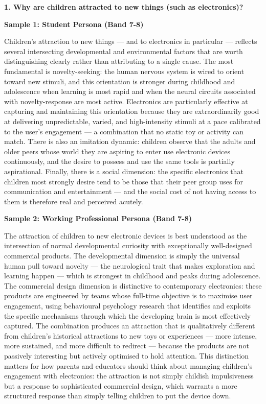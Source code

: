 \partthreeheader

\begin{ieltsquestion}
\textbf{1. Why are children attracted to new things (such as electronics)?}
\end{ieltsquestion}
\textbf{Sample 1: Student Persona (Band 7-8)}

Children's attraction to new things — and to electronics in particular — reflects several intersecting developmental and environmental factors that are worth distinguishing clearly rather than attributing to a single cause. The most fundamental is novelty-seeking: the human nervous system is wired to orient toward new stimuli, and this orientation is stronger during childhood and adolescence when learning is most rapid and when the neural circuits associated with novelty-response are most active. Electronics are particularly effective at capturing and maintaining this orientation because they are extraordinarily good at delivering unpredictable, varied, and high-intensity stimuli at a pace calibrated to the user's engagement — a combination that no static toy or activity can match. There is also an imitation dynamic: children observe that the adults and older peers whose world they are aspiring to enter use electronic devices continuously, and the desire to possess and use the same tools is partially aspirational. Finally, there is a social dimension: the specific electronics that children most strongly desire tend to be those that their peer group uses for communication and entertainment — and the social cost of not having access to them is therefore real and perceived acutely.

\textbf{Sample 2: Working Professional Persona (Band 7-8)}

The attraction of children to new electronic devices is best understood as the intersection of normal developmental curiosity with exceptionally well-designed commercial products. The developmental dimension is simply the universal human pull toward novelty — the neurological trait that makes exploration and learning happen — which is strongest in childhood and peaks during adolescence. The commercial design dimension is distinctive to contemporary electronics: these products are engineered by teams whose full-time objective is to maximise user engagement, using behavioural psychology research that identifies and exploits the specific mechanisms through which the developing brain is most effectively captured. The combination produces an attraction that is qualitatively different from children's historical attractions to new toys or experiences — more intense, more sustained, and more difficult to redirect — because the products are not passively interesting but actively optimised to hold attention. This distinction matters for how parents and educators should think about managing children's engagement with electronics: the attraction is not simply childish impulsiveness but a response to sophisticated commercial design, which warrants a more structured response than simply telling children to put the device down.


